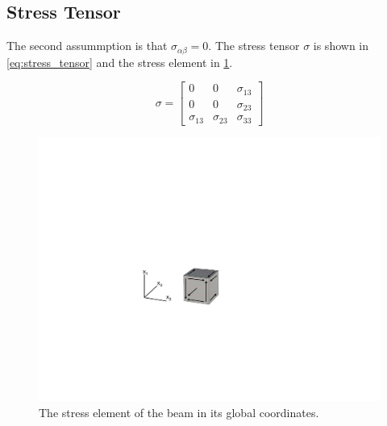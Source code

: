 \subsection{Stress Tensor}
\label{subsec:stress_tensor}
The second assummption is that $\sigma_{\alpha\beta}=0$.
The stress tensor $\sigma$ is shown in \cref{eq:stress_tensor} and the stress element in \cref{fig:stress_element}.

\begin{equation}
\sigma = \begin{bmatrix}
0 & 0 & \sigma_{13} \\
0 & 0 & \sigma_{23} \\
\sigma_{13} & \sigma_{23} & \sigma_{33}
\end{bmatrix}
\label{eq:stress_tensor}
\end{equation}

\begin{figure}%
\centering
\includegraphics[width=0.95\columnwidth,trim=4cm 7cm 6cm 6.5cm, clip]{figs/stress_element.pdf}
\caption{The stress element of the beam in its global coordinates. }
\label{fig:stress_element}
\end{figure}

